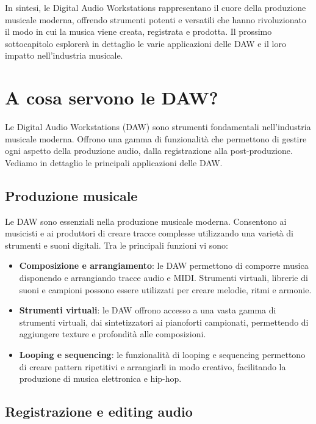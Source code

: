 \documentclass{book}
\begin{document}
In sintesi, le Digital Audio Workstations rappresentano il cuore della produzione musicale moderna, offrendo strumenti potenti e versatili che hanno rivoluzionato il modo in cui la musica viene creata, registrata e prodotta. Il prossimo sottocapitolo esplorerà in dettaglio le varie applicazioni delle DAW e il loro impatto nell’industria musicale.

\section{A cosa servono le DAW?}

Le Digital Audio Workstations (DAW) sono strumenti fondamentali nell’industria musicale moderna. Offrono una gamma di funzionalità che permettono di gestire ogni aspetto della produzione audio, dalla registrazione alla post-produzione. Vediamo in dettaglio le principali applicazioni delle DAW.

\subsection{Produzione musicale}

Le DAW sono essenziali nella produzione musicale moderna. Consentono ai musicisti e ai produttori di creare tracce complesse utilizzando una varietà di strumenti e suoni digitali. Tra le principali funzioni vi sono:

\begin{itemize}
\item \textbf{Composizione e arrangiamento}: le DAW permettono di comporre musica disponendo e arrangiando tracce audio e MIDI. Strumenti virtuali, librerie di suoni e campioni possono essere utilizzati per creare melodie, ritmi e armonie.
\item \textbf{Strumenti virtuali}: le DAW offrono accesso a una vasta gamma di strumenti virtuali, dai sintetizzatori ai pianoforti campionati, permettendo di aggiungere texture e profondità alle composizioni.
\item \textbf{Looping e sequencing}: le funzionalità di looping e sequencing permettono di creare pattern ripetitivi e arrangiarli in modo creativo, facilitando la produzione di musica elettronica e hip-hop.
\end{itemize}

\subsection{Registrazione e editing audio}
\end{document}
